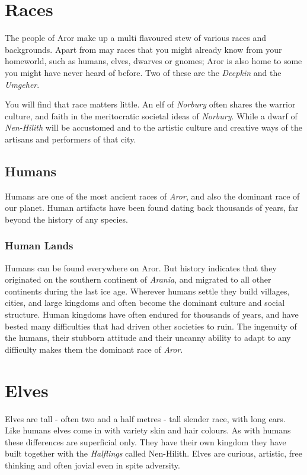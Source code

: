 \twocolumn
\section*{Races}

The people of Aror make up a multi flavoured stew of various races and
backgrounds. Apart from may races that you might already know from your
homeworld, such as humans, elves, dwarves or gnomes; Aror is also home to some
you might have never heard of before. Two of these are the
\emph{Deepkin} and the \emph{Umgeher}.

You will find that race matters little. An elf of \emph{Norbury} often shares
the warrior culture, and faith in the meritocratic societal ideas
of \emph{Norbury}. While a dwarf of \emph{Nen-Hilith} will be accustomed and
to the artistic culture and creative ways of the artisans and performers of
that city.

\subsection*{Humans}

Humans are one of the most ancient races of \emph{Aror}, and also the dominant
race of our planet. Human artifacts have been found dating back thousands of
years, far beyond the history of any species.

\subsubsection*{Human Lands}

Humans can be found everywhere on Aror. But history indicates that they
originated on the southern continent of \emph{Arania}, and migrated to all
other continents during the last ice age. Wherever humans settle they build
villages, cities, and large kingdoms and often become the dominant culture and
social structure. Human kingdoms have often endured for thousands of years,
and have bested many difficulties that had driven other societies to ruin.
The ingenuity of the humans, their stubborn attitude and their uncanny ability
to adapt to any difficulty makes them the dominant race of \emph{Aror}.

\section*{Elves}

Elves are tall - often two and a half metres - tall slender race, with long
ears. Like humans elves come in with variety skin and hair colours.  As with
humans these differences are superficial only. They have their own kingdom
they have built together with the \emph{Halflings} called Nen-Hilith. Elves
are curious, artistic, free thinking and often jovial even in spite
adversity.

